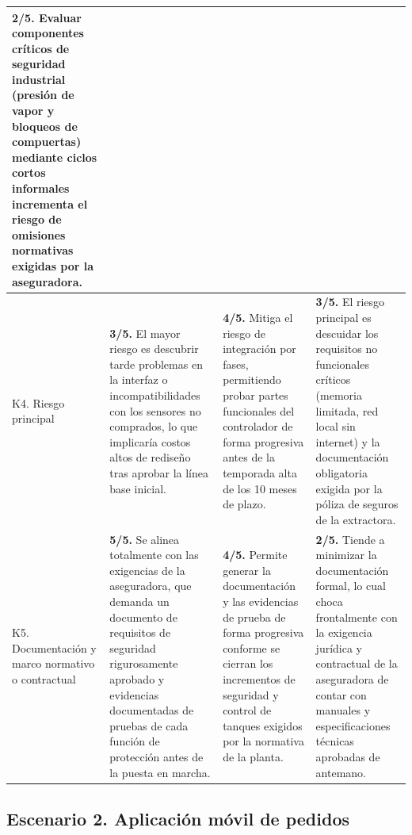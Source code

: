 \documentclass[11pt,a4paper]{article}
\begin{document}
\begin{longtable}{|p{2.6cm}|*{3}{>{\raggedright\arraybackslash}p{\dimexpr(\textwidth-2.6cm-8\tabcolsep-5\arrayrulewidth)/3\relax}|}}
	\textbf{2/5.} Evaluar componentes críticos de seguridad industrial (presión de vapor y bloqueos de compuertas) mediante ciclos cortos informales incrementa el riesgo de omisiones normativas exigidas por la aseguradora. \\ \hline
	K4. Riesgo principal &
	\textbf{3/5.} El mayor riesgo es descubrir tarde problemas en la interfaz o incompatibilidades con los sensores no comprados, lo que implicaría costos altos de rediseño tras aprobar la línea base inicial. &
	\textbf{4/5.} Mitiga el riesgo de integración por fases, permitiendo probar partes funcionales del controlador de forma progresiva antes de la temporada alta de los 10 meses de plazo. &
	\textbf{3/5.} El riesgo principal es descuidar los requisitos no funcionales críticos (memoria limitada, red local sin internet) y la documentación obligatoria exigida por la póliza de seguros de la extractora. \\ \hline
	K5. Documentación y marco normativo o contractual &
	\textbf{5/5.} Se alinea totalmente con las exigencias de la aseguradora, que demanda un documento de requisitos de seguridad rigurosamente aprobado y evidencias documentadas de pruebas de cada función de protección antes de la puesta en marcha. &
	\textbf{4/5.} Permite generar la documentación y las evidencias de prueba de forma progresiva conforme se cierran los incrementos de seguridad y control de tanques exigidos por la normativa de la planta. &
	\textbf{2/5.} Tiende a minimizar la documentación formal, lo cual choca frontalmente con la exigencia jurídica y contractual de la aseguradora de contar con manuales y especificaciones técnicas aprobadas de antemano. \\ \hline
\end{longtable}
	
	\subsection{Escenario 2. Aplicación móvil de pedidos}
	
\end{document}
